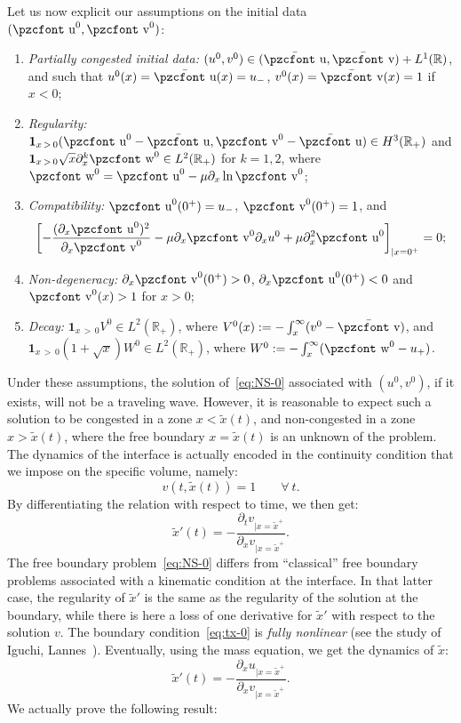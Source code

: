 \documentclass[10pt]{amsart}
\theoremstyle{definition}\newtheorem{defi}[theo]{Definition}\newtheorem{rema}[theo]{Remark}\newtheorem{exam}[theo]{Example}\newtheorem{exem}[theo]{Example}\newtheorem{nota}[theo]{Notation}
\newcommand{\mathpzc}[1]{\text{\pzcfont #1}}
\newcommand{\R}{\mathbb{R}}
\newcommand{\p}{\partial}
\newcommand{\bv}{\bar{\mathpzc{v}}}
\newcommand{\bu}{\bar{\mathpzc{u}}}
\newcommand{\bfun}{\mathbf{1}}
\newcommand{\tv}{\mathpzc{v}}
\newcommand{\tu}{\mathpzc{u}}
\newcommand{\tw}{\mathpzc{w}}
\newcommand{\tx}{\widetilde{x}}
\newcommand*{\Henumi}{\renewcommand*{\theenumi}{H\arabic{enumi}}}
\let\oldforall\forall
\renewcommand*{\forall}{\mathrel{\oldforall}}
\begin{document}
Let us now explicit our assumptions on the initial data~$(\tu^0, \tv^0)$:
\begin{enumerate}\Henumi
\item\label{H1} \emph{Partially congested initial data: }$(u^0, v^0)\in (\bu, \bv) + L^1(\R)$, and such that $u^0(x)=\bu(x)=u_-$, $v^0(x)=\bv(x)=1$ if $x<0$;

\item\label{H2} \emph{Regularity: }$\bfun_{x\,>\,0}(\tu^0-\bu, \tv^0-\bu)\in H^3(\R_+)$ and $\bfun_{x\,>\,0} \sqrt{x}\p_x^k \tw^0\in L^2(\R_+) $ for $k=1,2$, where $\tw^0 = \tu^0-\mu \p_x \ln \tv^0$;

\item\label{H3} \emph{Compatibility:} $\tu^0(0^+)=u_-$, $\tv^0(0^+)=1$, and
\begin{equation}
\left[-\frac{(\p_x \tu^0)^2}{\p_x \tv^0} - \mu \p_x \tv^0 \p_x u^0 + \mu \p_x^2 \tu^0\right]_{|x=0^+}=0;
\end{equation}

\item{\label{item:no-deg}} \emph{Non-degeneracy:} $\p_x \tv^0(0^+)>0$, $\p_x \tu^0(0^+)<0$ and $\tv^0(x)>1$ for $x>0$;

\item\label{H5} \emph{Decay: }$\bfun_{x\,>\,0}V^0\in L^2(\R_+)$, where $V^0(x):=-\int_x^\infty (v^0-\bv)$, and $\bfun_{x\,>\,0} (1+ \sqrt{x}) W^0 \in L^2(\R_+) $, where $W^0:=-\int_x^\infty (\tw^0-u_+)$.
\end{enumerate}



Under these assumptions, the solution of~\eqref{eq:NS-0} associated with $(u^0, v^0)$, if it exists, will not be a traveling wave. However, it is reasonable to expect such a solution to be congested in a zone $x<\tx(t)$, and non-congested in a zone $x>\tx(t)$, where the free boundary $x=\tx(t)$ is an unknown of the problem. The dynamics of the interface is actually encoded in the continuity condition that we impose on the specific volume, namely:
\begin{equation}\label{eq:cont-v-i}
v(t, \tx(t)) = 1 \qquad \forall\ t.
\end{equation}
By differentiating the relation with respect to time, we then get:
\begin{equation}\label{eq:tx-0}
\tx'(t) = - \dfrac{\partial_t v_{|x=\tx^+}}{\partial_x v_{|x=\tx^+}}.
\end{equation}
The free boundary problem~\eqref{eq:NS-0} differs from ``classical'' free boundary problems associated with a kinematic condition at the interface. In that latter case, the regularity of $\tx'$ is the same as the regularity of the solution at the boundary, while there is here a loss of one derivative for $\tx'$ with respect to the solution $v$. The boundary condition~\eqref{eq:tx-0} is \emph{fully nonlinear} (see the study of Iguchi, Lannes~\cite{iguchi2019}). Eventually, using the mass equation, we get the dynamics of $\tx$:
\begin{equation}\label{EDO-2}
\tx'(t) = - \frac{\p_x u_{|x=\tx^+}}{\p_x v_{|x=\tx^+}}.
\end{equation}
We actually prove the following result:
\end{document}
